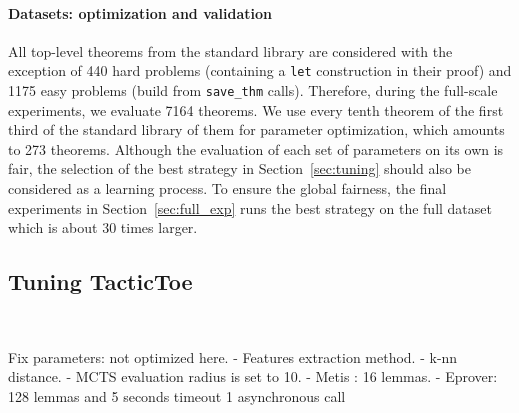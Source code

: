 \documentclass[runningheads,a4paper,draft]{svjour3}
\def\tactictoe{\textsf{TacticToe}\xspace}
\begin{document}
\paragraph{Datasets: optimization and validation}
All top-level theorems from the standard library are considered with the 
exception of 440 hard problems (containing a \texttt{let} construction in their 
proof) and 1175 easy problems (build from \texttt{save\_thm} calls). 
Therefore, during the full-scale experiments, we evaluate 7164 theorems.
We use every tenth theorem of the first third of the standard library of 
them for parameter optimization, which amounts to 273 theorems.
Although the evaluation of each set of parameters on its own is fair, 
the selection of the best strategy in Section~\ref{sec:tuning} should also be 
considered as a learning process. To ensure the global fairness, the final 
experiments in Section~\ref{sec:full_exp} runs the best strategy on the full 
dataset which is about 30 times larger.

\subsection{Tuning \tactictoe}~\label{sec:tuning}

Fix parameters: not optimized here. 
 - Features extraction method.
 - k-nn distance.
 - MCTS evaluation radius is set to 10. 
 - Metis : 16 lemmas.
 - Eprover: 128 lemmas and 5 seconds timeout 1 asynchronous call
\end{document}
